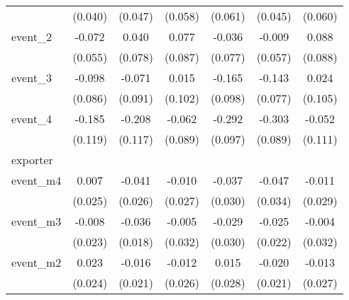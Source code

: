 {\begin{tabular}{l*{6}{c}}
            &     (0.040)         &     (0.047)         &     (0.058)         &     (0.061)         &     (0.045)         &     (0.060)         \\
[1em]
event\_2     &      -0.072         &       0.040         &       0.077         &      -0.036         &      -0.009         &       0.088         \\
            &     (0.055)         &     (0.078)         &     (0.087)         &     (0.077)         &     (0.057)         &     (0.088)         \\
[1em]
event\_3     &      -0.098         &      -0.071         &       0.015         &      -0.165         &      -0.143         &       0.024         \\
            &     (0.086)         &     (0.091)         &     (0.102)         &     (0.098)         &     (0.077)         &     (0.105)         \\
[1em]
event\_4     &      -0.185         &      -0.208         &      -0.062         &      -0.292\sym{**} &      -0.303\sym{***}&      -0.052         \\
            &     (0.119)         &     (0.117)         &     (0.089)         &     (0.097)         &     (0.089)         &     (0.111)         \\
\hline
exporter    &                     &                     &                     &                     &                     &                     \\
event\_m4    &       0.007         &      -0.041         &      -0.010         &      -0.037         &      -0.047         &      -0.011         \\
            &     (0.025)         &     (0.026)         &     (0.027)         &     (0.030)         &     (0.034)         &     (0.029)         \\
[1em]
event\_m3    &      -0.008         &      -0.036         &      -0.005         &      -0.029         &      -0.025         &      -0.004         \\
            &     (0.023)         &     (0.018)         &     (0.032)         &     (0.030)         &     (0.022)         &     (0.032)         \\
[1em]
event\_m2    &       0.023         &      -0.016         &      -0.012         &       0.015         &      -0.020         &      -0.013         \\
            &     (0.024)         &     (0.021)         &     (0.026)         &     (0.028)         &     (0.021)         &     (0.027)         \\

\end{tabular}}
